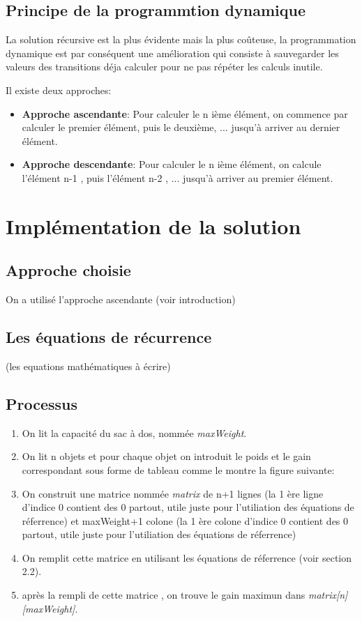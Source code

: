 \documentclass[12pt]{report}
\begin{document}
	\section{Principe de la programmtion dynamique}
	La solution récursive est la plus évidente mais la plus coûteuse, la programmation dynamique est par conséquent une amélioration qui consiste à sauvegarder les valeurs des transitions déja calculer pour ne pas répéter les calculs inutile.
	\par{}
	Il existe deux approches:
	\begin{itemize}
		\item \textbf {Approche ascendante}:
		Pour calculer le n ième élément, on commence par calculer le premier élément, puis le deuxième, ... jusqu'à arriver au dernier élément.
		\item \textbf {Approche descendante}:
		Pour calculer le n ième élément, on calcule l'élément n-1 , puis l'élément n-2 , ... jusqu'à arriver au premier élément.
		
	\end{itemize}	
	\chapter{Implémentation de la solution}
	\section{Approche choisie}
	On a utilisé l'approche ascendante (voir introduction)
	\section{Les équations de récurrence}
	(les equations mathématiques à écrire)
	\section{Processus}\begin{enumerate}
		\item On lit la capacité du sac à dos, nommée \emph{maxWeight}.
		\item On lit n objets et pour chaque objet on introduit le poids et le gain correspondant sous forme de tableau comme le montre la figure suivante:
		\item On construit une matrice nommée \emph{matrix} de n+1 lignes (la 1 ère ligne d'indice 0 contient des 0 partout, utile juste pour l'utiliation des équations de réferrence) et maxWeight+1 colone (la 1 ère colone d'indice 0 contient des 0 partout, utile juste pour l'utiliation des équations de réferrence)
		\item On remplit cette matrice en utilisant les équations de réferrence (voir section 2.2).
		\item après la rempli de cette matrice , on trouve le gain maximun dans \emph{matrix[n][maxWeight]}.
	\end{enumerate}
	
		
		
\end{document}
